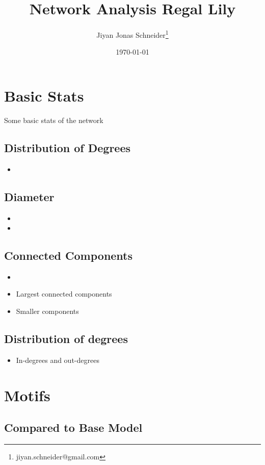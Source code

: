 \documentclass[11pt]{article}
\author{Jiyan Jonas Schneider\thanks{jiyan.schneider@gmail.com}}
\date{\today}
\title{Network Analysis Regal Lily}
\begin{document}
\maketitle
\tableofcontents

\section*{Basic Stats}
\label{sec:orgeb4fd07}
Some basic stats of the network
\subsection*{Distribution of Degrees}
\label{sec:orgb928d60}
\begin{itemize}
\item{}
\end{itemize}
\subsection*{Diameter}
\label{sec:org5822796}
\begin{itemize}
\item\relax [ Diameter ]
\item{}
\end{itemize}
\subsection*{Connected Components}
\label{sec:orgd9bdd9b}
\begin{itemize}
\item{}
\item Largest connected components
\item Smaller components
\end{itemize}
\subsection*{Distribution of degrees}
\label{sec:org361aefe}
\begin{itemize}
\item In-degrees and out-degrees
\end{itemize}
\section*{Motifs}
\label{sec:orge565dfd}
\subsection*{Compared to Base Model}
\label{sec:org9ea1fe6}
\end{document}
